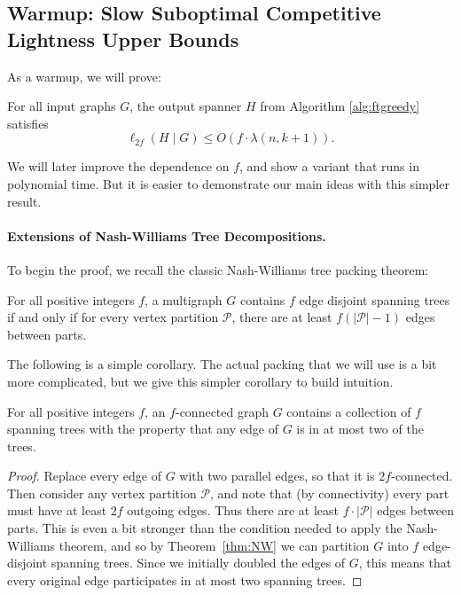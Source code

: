 \subsection{Warmup: Slow Suboptimal Competitive Lightness Upper Bounds} \label{sec:warmup}

As a warmup, we will prove:
\begin{theorem} [Warmup] \label{thm:mainbadf}
For all input graphs $G$, the output spanner $H$ from Algorithm \ref{alg:ftgreedy} satisfies
$$\ell_{2f}(H \mid G) \le O\left( f \cdot \lambda(n, k+1) \right).$$
\end{theorem}

We will later improve the dependence on $f$, and show a variant that runs in polynomial time.  But it is easier to demonstrate our main ideas with this simpler result. 

\paragraph{Extensions of Nash-Williams Tree Decompositions.}

To begin the proof, we recall the classic Nash-Williams tree packing theorem:
\begin{theorem}  \label{thm:NW}
For all positive integers $f$, a multigraph $G$ contains $f$ edge disjoint spanning trees if and only if for every vertex partition $\mathcal{P}$, there are at least $f(|\mathcal{P}|-1)$ edges between parts.
\end{theorem}

The following is a simple corollary.  The actual packing that we will use is a bit more complicated, but we give this simpler corollary to build intuition. 

\begin{corollary} \label{cor:nwdecomp}
For all positive integers $f$, an $f$-connected graph $G$ contains a collection of $f$ spanning trees with the property that any edge of $G$ is in at most two of the trees.
\end{corollary}
\begin{proof}
Replace every edge of $G$ with two parallel edges, so that it is $2f$-connected.
Then consider any vertex partition $\mathcal{P}$, and note that (by connectivity) every part must have at least $2f$ outgoing edges.
Thus there are at least $f \cdot |\mathcal{P}|$ edges between parts.  
This is even a bit stronger than the condition needed to apply the Nash-Williams theorem, and so by Theorem~\ref{thm:NW} we can partition $G$ into $f$ edge-disjoint spanning trees.  Since we initially doubled the edges of $G$, this means that every original edge participates in at most two spanning trees.
\end{proof}

